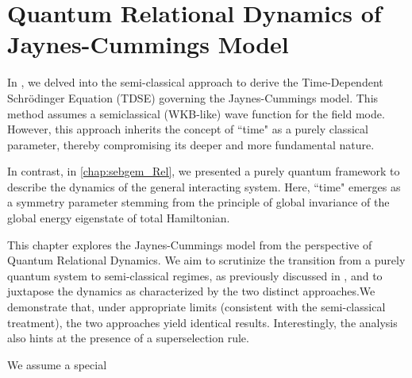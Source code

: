 \chapter{Quantum Relational Dynamics of Jaynes-Cummings Model
\label{chap5:RDQ_JCM_chap}}

In , we delved into the semi-classical approach to derive the Time-Dependent Schrödinger Equation (TDSE) governing the Jaynes-Cummings model. 
This method assumes a semiclassical (WKB-like) wave function for the field mode. However, 
this approach inherits the concept of ``time" as a purely classical parameter, thereby compromising its deeper and more fundamental nature.

In contrast, in \ref{chap:sebgem_Rel}, we presented a purely quantum framework to describe the dynamics of the general interacting system. Here, ``time" 
emerges as a symmetry parameter stemming from the principle of global invariance of the global energy 
eigenstate of total Hamiltonian.

This chapter explores the Jaynes-Cummings model from the perspective of Quantum Relational Dynamics. 
We aim to scrutinize the transition from a purely quantum system to semi-classical regimes, 
as previously discussed in , and to juxtapose the dynamics as 
characterized by the two distinct approaches.We demonstrate that, under appropriate limits
(consistent with the semi-classical treatment), the two approaches yield identical results. 
Interestingly, the analysis also hints at the presence of a superselection rule.

We assume a special